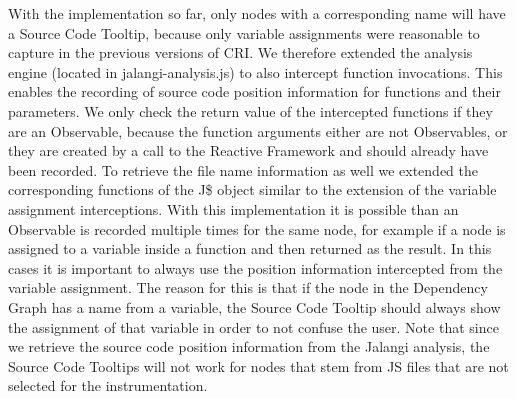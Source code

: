 With the implementation so far, only nodes with a corresponding name will have a Source Code Tooltip, because only variable assignments were reasonable to capture in the previous versions of CRI. We therefore extended the analysis engine (located in jalangi-analysis.js) to also intercept function invocations. This enables the recording of source code position information for functions and their parameters. We only check the return value of the intercepted functions if they are an Observable, because the function arguments either are not Observables, or they are created by a call to the Reactive Framework and should already have been recorded. To retrieve the file name information as well we extended the corresponding functions of the J\$ object similar to the extension of the variable assignment interceptions. With this implementation it is possible than an Observable is recorded multiple times for the same node, for example if a node is assigned to a variable inside a function and then returned as the result. In this cases it is important to always use the position information intercepted from the variable assignment. The reason for this is that if the node in the Dependency Graph has a name from a variable, the Source Code Tooltip should always show the assignment of that variable in order to not confuse the user. Note that since we retrieve the source code position information from the Jalangi analysis, the Source Code Tooltips will not work for nodes that stem from JS files that are not selected for the instrumentation.\\

